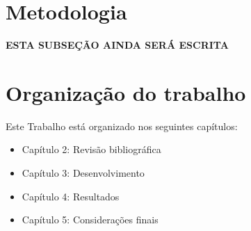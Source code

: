 \section{Metodologia} %

\textbf{ESTA SUBSEÇÃO AINDA SERÁ ESCRITA}





\section{Organização do trabalho}

Este Trabalho está organizado nos seguintes capítulos:

\begin{itemize}
	\item Capítulo 2: Revisão bibliográfica %
	\item Capítulo 3: Desenvolvimento %
	\item Capítulo 4: Resultados %
	\item Capítulo 5: Considerações finais %
\end{itemize}
